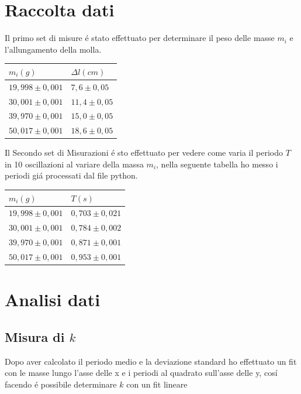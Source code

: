 \documentclass{exam}
\begin{document}
	\section{Raccolta dati}
		Il primo set di misure \'e stato effettuato per determinare il peso delle masse $m_i$ e l'allungamento della molla.
		\begin{center}
			\begin{tabular}{ll}
				\toprule
				$m_i(g)$&$\Delta l(cm)$\\
				\midrule
				$19,998\pm0,001$&$7,6\pm0,05$\\
				$30,001\pm0,001$&$11,4\pm0,05$\\
				$39,970\pm0,001$&$15,0\pm0,05$\\
				$50,017\pm0,001$&$18,6\pm0,05$\\
				\bottomrule
			\end{tabular}
		\end{center}
		Il Secondo set di Misurazioni \'e sto effettuato per vedere come varia il periodo $T$ in 10 oscillazioni al variare della massa $m_i$, nella seguente tabella ho messo i periodi gi\'a processati dal file python.
		\begin{center}
			\begin{tabular}{ll}
				\toprule
				$m_i(g)$&$T(s)$\\
				\midrule
				$19,998\pm0,001$&$0,703\pm0,021$\\
				$30,001\pm0,001$&$0,784\pm0,002$\\
				$39,970\pm0,001$&$0,871\pm0,001$\\
				$50,017\pm0,001$&$0,953\pm0,001$\\
				\bottomrule
			\end{tabular}
		\end{center}
	\section{Analisi dati}
		\subsection{Misura di $k$}
			Dopo aver calcolato il periodo medio e la deviazione standard ho effettuato un fit con le masse lungo l'asse delle x e i periodi al quadrato sull'asse delle y, cos\'i facendo \'e possibile determinare $k$ con un fit lineare\\
\end{document}
